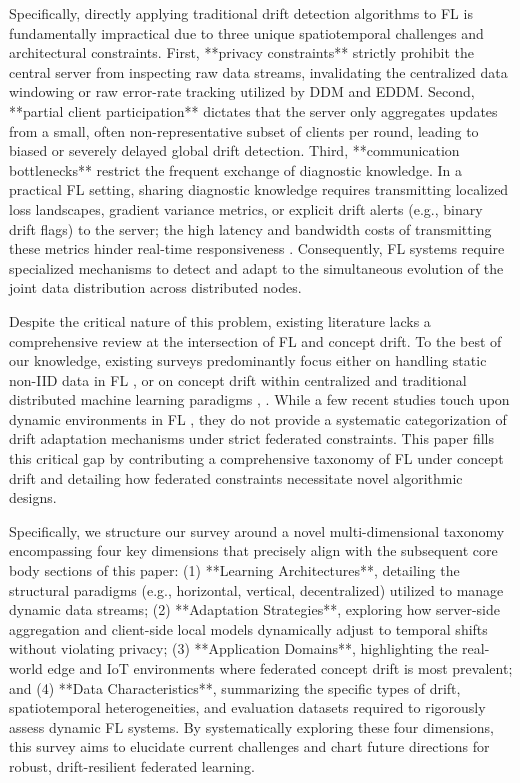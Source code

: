 \documentclass[journal]{IEEEtran}
\begin{document}
Specifically, directly applying traditional drift detection algorithms to FL is fundamentally impractical due to three unique spatiotemporal challenges and architectural constraints. First, **privacy constraints** strictly prohibit the central server from inspecting raw data streams, invalidating the centralized data windowing or raw error-rate tracking utilized by DDM and EDDM. Second, **partial client participation** dictates that the server only aggregates updates from a small, often non-representative subset of clients per round, leading to biased or severely delayed global drift detection. Third, **communication bottlenecks** restrict the frequent exchange of diagnostic knowledge. In a practical FL setting, sharing diagnostic knowledge requires transmitting localized loss landscapes, gradient variance metrics, or explicit drift alerts (e.g., binary drift flags) to the server; the high latency and bandwidth costs of transmitting these metrics hinder real-time responsiveness \cite{paper810}. Consequently, FL systems require specialized mechanisms to detect and adapt to the simultaneous evolution of the joint data distribution across distributed nodes.

Despite the critical nature of this problem, existing literature lacks a comprehensive review at the intersection of FL and concept drift. To the best of our knowledge, existing surveys predominantly focus either on handling static non-IID data in FL \cite{Deshwal2025}, \cite{paper804} or on concept drift within centralized and traditional distributed machine learning paradigms \cite{Hinder2024}, \cite{paper808}. While a few recent studies touch upon dynamic environments in FL \cite{paper811}, they do not provide a systematic categorization of drift adaptation mechanisms under strict federated constraints. This paper fills this critical gap by contributing a comprehensive taxonomy of FL under concept drift and detailing how federated constraints necessitate novel algorithmic designs.

Specifically, we structure our survey around a novel multi-dimensional taxonomy encompassing four key dimensions that precisely align with the subsequent core body sections of this paper: (1) **Learning Architectures**, detailing the structural paradigms (e.g., horizontal, vertical, decentralized) utilized to manage dynamic data streams; (2) **Adaptation Strategies**, exploring how server-side aggregation and client-side local models dynamically adjust to temporal shifts without violating privacy; (3) **Application Domains**, highlighting the real-world edge and IoT environments where federated concept drift is most prevalent; and (4) **Data Characteristics**, summarizing the specific types of drift, spatiotemporal heterogeneities, and evaluation datasets required to rigorously assess dynamic FL systems. By systematically exploring these four dimensions, this survey aims to elucidate current challenges and chart future directions for robust, drift-resilient federated learning.
\end{document}
